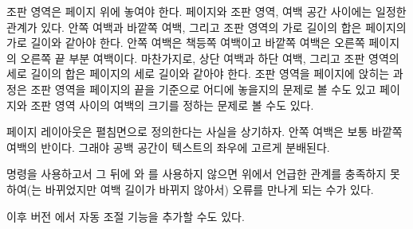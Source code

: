 조판 영역은 페이지 위에 놓여야 한다. 페이지와 조판 영역, 여백 공간 사이에는
일정한 관계가 있다. 안쪽 여백과 바깥쪽 여백, 그리고 조판 영역의 가로 길이의
합은 페이지의 가로 길이와 같아야 한다. 안쪽 여백은 책등쪽 여백이고 바깥쪽 여백은 오른쪽 페이지의 오른쪽 끝 부분 여백이다.
마찬가지로, 상단 여백과 하단 여백, 그리고 조판 영역의 세로 길이의 합은
페이지의 세로 길이와 같아야 한다.
조판 영역을 페이지에 앉히는 과정은 조판 영역을 페이지의 끝을 기준으로
어디에 놓을지의 문제로 볼 수도 있고 페이지와 조판 영역 사이의 여백의
크기를 정하는 문제로 볼 수도 있다.

페이지 레이아웃은 펼침면으로 정의한다는 사실을 상기하자.
안쪽 여백은 보통 바깥쪽 여백의 반이다. 그래야 공백 공간이 텍스트의 좌우에 
고르게 분배된다.

\begin{note}
\cmd{\settypeblocksize} 명령을 사용하고서 그 뒤에 \cmd{\setlrmargins}와
\cmd{\setulmargins}를 사용하지 않으면 위에서 언급한 관계를 충족하지 못하여(\lnc{\textwidth}는 바뀌었지만 여백 길이가 바뀌지 않아서) 오류를 만나게 되는 수가 있다.

이후 버전 \theclass 에서 자동 조절 기능을 추가할 수도 있다.
\end{note}


